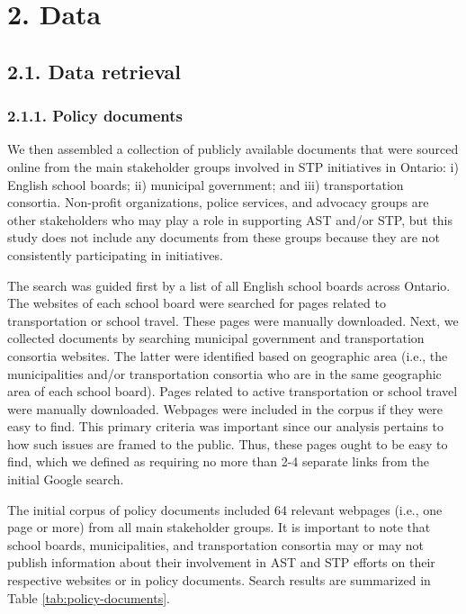 \documentclass[]{elsarticle} %
\begin{document}
\hypertarget{data}{%
\section{2. Data}\label{data}}

\hypertarget{data-retrieval}{%
\subsection{2.1. Data retrieval}\label{data-retrieval}}

\hypertarget{policy-documents}{%
\subsubsection{2.1.1. Policy documents}\label{policy-documents}}

We then assembled a collection of publicly available documents that were
sourced online from the main stakeholder groups involved in STP
initiatives in Ontario: i) English school boards; ii) municipal
government; and iii) transportation consortia. Non-profit organizations,
police services, and advocacy groups are other stakeholders who may play
a role in supporting AST and/or STP, but this study does not include any
documents from these groups because they are not consistently
participating in initiatives.

The search was guided first by a list of all English school boards
across Ontario. The websites of each school board were searched for
pages related to transportation or school travel. These pages were
manually downloaded. Next, we collected documents by searching municipal
government and transportation consortia websites. The latter were
identified based on geographic area (i.e., the municipalities and/or
transportation consortia who are in the same geographic area of each
school board). Pages related to active transportation or school travel
were manually downloaded. Webpages were included in the corpus if they
were easy to find. This primary criteria was important since our
analysis pertains to how such issues are framed to the public. Thus,
these pages ought to be easy to find, which we defined as requiring no
more than 2-4 separate links from the initial Google search.

The initial corpus of policy documents included 64 relevant webpages
(i.e., one page or more) from all main stakeholder groups. It is
important to note that school boards, municipalities, and transportation
consortia may or may not publish information about their involvement in
AST and STP efforts on their respective websites or in policy documents.
Search results are summarized in Table \ref{tab:policy-documents}.
\end{document}
